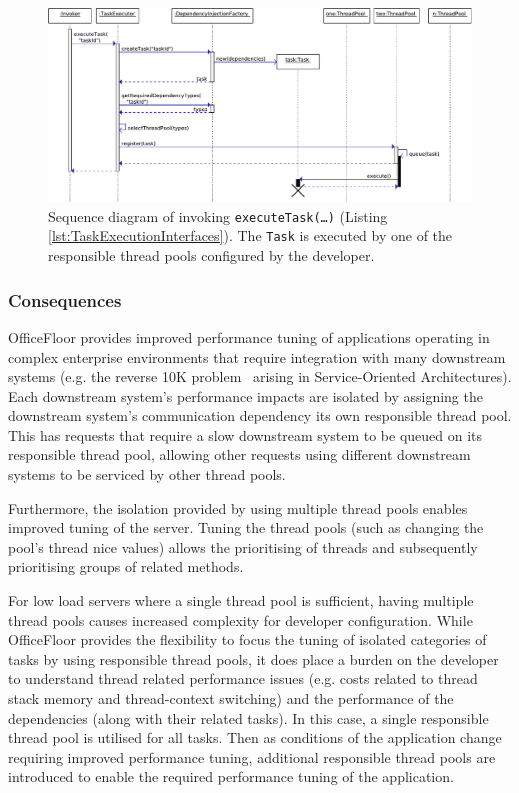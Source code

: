 \documentclass[prodmode]{style/acmlarge}
\begin{document}
\begin{figure}[!t]
\centering
\includegraphics[width=6in]{ExecuteComponentSequenceDiagram}
\caption{Sequence diagram of invoking \texttt{executeTask(\ldots)} (Listing \ref{lst:TaskExecutionInterfaces}).  The \texttt{Task} is executed by one of the responsible thread pools configured by the developer.}
\label{fig:ExecuteComponentSequenceDiagram}
\end{figure}


\subsubsection*{Consequences}

OfficeFloor provides improved performance tuning of applications operating in
complex enterprise environments that require integration with many downstream
systems (e.g. the reverse 10K problem~\cite{reverse-ten-k-problem} arising in
Service-Oriented Architectures).  Each downstream system's performance impacts
are isolated by assigning the downstream system's communication dependency its
own responsible thread pool.  This has requests that require a slow downstream
system to be queued on its responsible thread pool, allowing other requests
using different downstream systems to be serviced by other thread pools.

Furthermore, the isolation provided by using multiple thread pools enables
improved tuning of the server.  Tuning the thread pools (such as changing the
pool's thread nice values) allows the prioritising of threads and subsequently
prioritising groups of related methods.

For low load servers where a single thread pool is sufficient, having multiple
thread pools causes increased complexity for developer configuration.  While
OfficeFloor provides the flexibility to focus the tuning of isolated categories
of tasks by using responsible thread pools, it does place a burden on the
developer to understand thread related performance issues (e.g. costs related to
thread stack memory and thread-context switching) and the performance of the
dependencies (along with their related tasks).  In this case, a single
responsible thread pool is utilised for all tasks.  Then as conditions of the
application change requiring improved performance tuning, additional responsible
thread pools are introduced to enable the required performance tuning of the
application.
\end{document}
